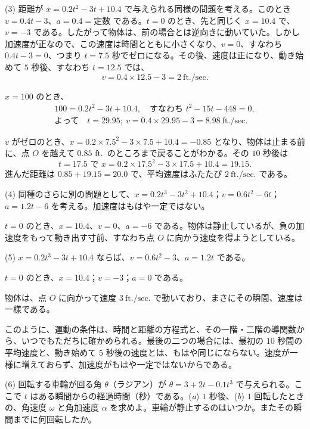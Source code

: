 \documentclass[a4paper,11pt,openany]{ltjsbook}
\begin{document}
(3) 距離が $x = 0.2t^2 - 3t + 10.4$ で与えられる同様の問題を考える。このとき $v = 0.4t - 3$、$a = 0.4 = \text{定数}$ である。$t = 0$ のとき、先と同じく $x = 10.4$ で、$v = -3$ である。したがって物体は、前の場合とは逆向きに動いていた。しかし加速度が正なので、この速度は時間とともに小さくなり、$v = 0$、すなわち $0.4t - 3 = 0$、つまり $t = 7.5$ 秒でゼロになる。その後、速度は正になり、動き始めて $5$ 秒後、すなわち $t = 12.5$ では、
\[
v = 0.4 \times 12.5 - 3 = 2~\text{ft./sec.}
\]

$x = 100$ のとき、
\begin{gather*}
100 = 0.2t^2 - 3t + 10.4,\quad \text{すなわち } t^2 - 15t - 448 = 0, \\
\text{よって}\quad t = 29.95;\ v = 0.4 \times 29.95 - 3 = 8.98~\text{ft./sec.}
\end{gather*}

$v$ がゼロのとき、$x = 0.2 \times 7.5^2 - 3 \times 7.5 + 10.4 = -0.85$ となり、物体は止まる前に、点 $O$ を越えて $0.85$ ft.\ のところまで戻ることがわかる。その $10$ 秒後は
\[
t = 17.5 \text{ で } x = 0.2 \times 17.5^2 - 3 \times 17.5 + 10.4 = 19.15.
\]
進んだ距離は $0.85 + 19.15 = 20.0$ で、平均速度はふたたび $2~\text{ft./sec.}$ である。

(4) 同種のさらに別の問題として、$x = 0.2t^3 - 3t^2 + 10.4$；$v = 0.6t^2 - 6t$；$a = 1.2t - 6$ を考える。加速度はもはや一定ではない。

$t = 0$ のとき、$x = 10.4$、$v = 0$、$a = -6$ である。物体は静止しているが、負の加速度をもって動き出す寸前、すなわち点 $O$ に向かう速度を得ようとしている。

(5) $x = 0.2t^3 - 3t + 10.4$ ならば、$v = 0.6t^2 - 3$、$a = 1.2t$ である。

$t = 0$ のとき、$x = 10.4$；$v = -3$；$a = 0$ である。

物体は、点 $O$ に向かって速度 $3~\text{ft./sec.}$ で動いており、まさにその瞬間、速度は一様である。

このように、運動の条件は、時間と距離の方程式と、その一階・二階の導関数から、いつでもただちに確かめられる。最後の二つの場合には、最初の $10$ 秒間の平均速度と、動き始めて $5$ 秒後の速度とは、もはや同じにならない。速度が一様に増えておらず、加速度がもはや一定ではないからである。

(6) 回転する車輪が回る角 $\theta$（ラジアン）が $\theta = 3 + 2t - 0.1t^3$ で与えられる。ここで $t$ はある瞬間からの経過時間（秒）である。(\textit{a}) $1$ 秒後、(\textit{b}) $1$ 回転したときの、角速度 $\omega$ と角加速度 $\alpha$ を求めよ。車輪が静止するのはいつか。またその瞬間までに何回転したか。
\end{document}
